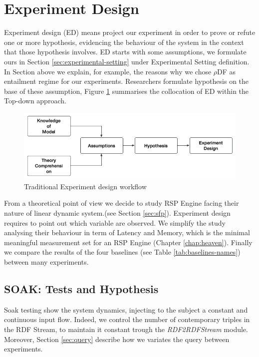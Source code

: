 \section{Experiment Design}\label{sec:experiment-design}

Experiment design (ED) means project our experiment in order to prove or refute one or more hypothesis, evidencing the behaviour of the system in the context that those hypothesis involves. ED starts with some assumptions, we formulate ours in Section \ref{sec:experimental-setting} under Experimental Setting definition. In Section above we explain, for example, the reasons why we chose $\rho$DF as entailment regime for our experiments. Researchers formulate hypothesis on the base of these assumption, Figure \ref{fig:experiment-design} summarises the collocation of ED within the Top-down approach.

\begin{figure}[tbh]
  \centering
	\includegraphics[width=\linewidth]{images/experiment-design}
	\caption{Traditional Experiment design workflow} 
  	\label{fig:experiment-design}
\end{figure}


From a theoretical point of view we decide to study RSP Engine facing their nature of linear dynamic system.(see Section \ref{sec:sfp}). Experiment design requires to point out which variable are observed. We simplify the study analysing their behaviour in term of Latency and Memory, which is the minimal meaningful measurement set for an RSP Engine (Chapter \ref{chap:heaven}). Finally we compare the results of the four baselines (see Table \ref{tab:baselines-names}) between many experiments.

\subsection{SOAK: Tests and Hypothesis}\label{sec:soak-es}

Soak testing show the system dynamics, injecting to the subject a constant and continuous input flow.  Indeed, we control the number of contemporary triples in the RDF Stream, to maintain it constant trough the \textit{RDF2RDFStream} module. Moreover, Section \ref{sec:query} describe how we variates the query between experiments.

